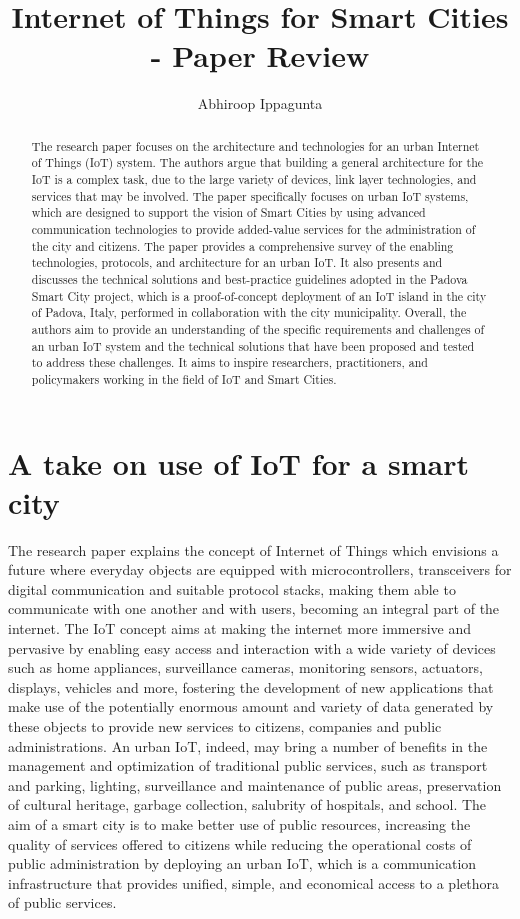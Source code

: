 \documentclass{article}
\title{Internet of Things for Smart Cities - Paper Review}
\author{Abhiroop Ippagunta}
\begin{document}
\maketitle

\begin{abstract}
The research paper focuses on the architecture and technologies for an urban Internet of Things (IoT) system. The authors argue that building a general architecture for the IoT is a complex task, due to the large variety of devices, link layer technologies, and services that may be involved. The paper specifically focuses on urban IoT systems, which are designed to support the vision of Smart Cities by using advanced communication technologies to provide added-value services for the administration of the city and citizens.
The paper provides a comprehensive survey of the enabling technologies, protocols, and architecture for an urban IoT. It also presents and discusses the technical solutions and best-practice guidelines adopted in the Padova Smart City project, which is a proof-of-concept deployment of an IoT island in the city of Padova, Italy, performed in collaboration with the city municipality.
Overall, the authors aim to provide an understanding of the specific requirements and challenges of an urban IoT system and the technical solutions that have been proposed and tested to address these challenges. It aims to inspire researchers, practitioners, and policymakers working in the field of IoT and Smart Cities.

\end{abstract}

\section{A take on use of IoT for a smart city}
The research paper explains the concept of Internet of Things which envisions a future where everyday objects are equipped with microcontrollers, transceivers for digital communication and suitable protocol stacks, making them able to communicate with one another and with users, becoming an integral part of the internet. 
The IoT concept aims at making the internet more immersive and pervasive by enabling easy access and interaction with a wide variety of devices such as home appliances, surveillance cameras, monitoring sensors, actuators, displays, vehicles and more, fostering the development of new applications that make use of the potentially enormous amount and variety of data generated by these objects to provide new services to citizens, companies and public administrations.
 An urban IoT, indeed, may bring a number of benefits in the management and optimization of traditional public services,
such as transport and parking, lighting, surveillance and maintenance of public areas, preservation of cultural heritage, garbage collection, salubrity of hospitals, and school.
 The aim of a smart city is to make better use of public resources, increasing the quality of services offered to citizens while reducing the operational costs of public administration by deploying an urban IoT, which is a communication infrastructure that provides unified, simple, and economical access to a plethora of public services.
 
\end{document}
